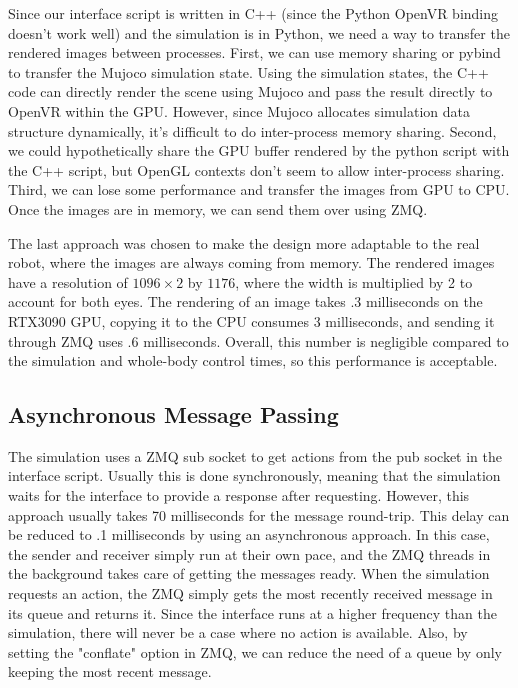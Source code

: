 Since our interface script is written in C++ (since the Python OpenVR binding doesn't work well) and the simulation is in Python, we need a way to transfer the rendered images between processes. 
First, we can use memory sharing or pybind to transfer the Mujoco simulation state. Using the simulation states, the C++ code can directly render the scene using Mujoco and pass the result directly to OpenVR within the GPU. However, since Mujoco allocates simulation data structure dynamically, it's difficult to do inter-process memory sharing. Second, we could hypothetically share the GPU buffer rendered by the python script with the C++ script, but OpenGL contexts don't seem to allow inter-process sharing. Third, we can lose some performance and transfer the images from GPU to CPU. Once the images are in memory, we can send them over using ZMQ. 

The last approach was chosen to make the design more adaptable to the real robot, where the images are always coming from memory. The rendered images have a resolution of $1096 \times 2$ by $1176$, where the width is multiplied by 2 to account for both eyes. The rendering of an image takes .3 milliseconds on the RTX3090 GPU, copying it to the CPU consumes 3 milliseconds, and sending it through ZMQ uses .6 milliseconds. Overall, this number is negligible compared to the simulation and whole-body control times, so this performance is acceptable. 

\subsection{Asynchronous Message Passing}

The simulation uses a ZMQ sub socket to get actions from the pub socket in the interface script. Usually this is done synchronously, meaning that the simulation waits for the interface to provide a response after requesting. However, this approach usually takes 70 milliseconds for the message round-trip. This delay can be reduced to .1 milliseconds by using an asynchronous approach. In this case, the sender and receiver simply run at their own pace, and the ZMQ threads in the background takes care of getting the messages ready. When the simulation requests an action, the ZMQ simply gets the most recently received message in its queue and returns it. Since the interface runs at a higher frequency than the simulation, there will never be a case where no action is available. Also, by setting the "conflate" option in ZMQ, we can reduce the need of a queue by only keeping the most recent message. 

